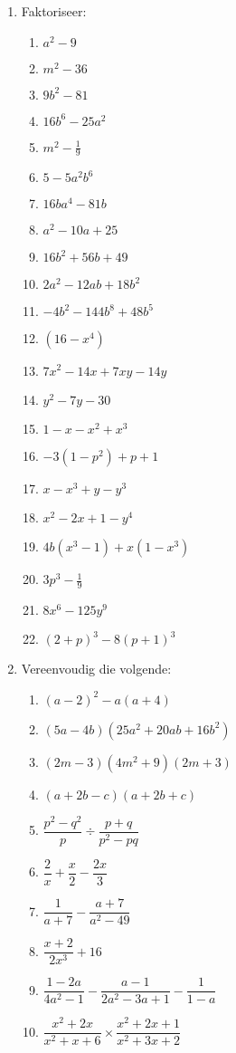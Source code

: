 \begin{eocexercises}{}
\begin{enumerate}[itemsep=5pt, label=\textbf{\arabic*}. ]
\item Faktoriseer:
\begin{multicols}{2}
\begin{enumerate}[itemsep=5pt, label=\textbf{\alph*}. ] 
\item ${a}^{2}-9$
\item ${m}^{2}-36$
\item $9{b}^{2}-81$
\item $16{b}^{6}-25{a}^{2}$
\item ${m}^{2}-\frac{1}{9}$
\item $5-5{a}^{2}{b}^{6}$
\item $16b{a}^{4}-81b$
\item ${a}^{2}-10a+25$
\item $16{b}^{2}+56b+49$
\item $2{a}^{2}-12ab+18{b}^{2}$
\item $-4{b}^{2}-144{b}^{8}+48{b}^{5}$
\item $(16-{x}^{4})$
\item ${7x}^{2}-14x+7xy-14y$
\item ${y}^{2}-7y-30$
\item $1-x-{x}^{2}+{x}^{3}$
\item $-3(1-{p}^{2})+p+1$
\item $x-x^{3} + y - y^{3}$
\item $x^{2} - 2x + 1 - y^{4}$
\item $4b(x^{3} - 1) + x(1-x^{3})$
\item $3p^{3} - \frac{1}{9}$
\item $8x^6-125y^9$
\item $(2+p)^3- 8(p+1)^3$
\end{enumerate}
\end{multicols}


\item Vereenvoudig die volgende:
\begin{multicols}{2}
\begin{enumerate}[itemsep=5pt, label=\textbf{\alph*}. ] 

\item ${(a-2)}^{2}-a(a+4)$
\item $(5a-4b)(25{a}^{2}+20ab+16{b}^{2})$
\item $(2m-3)(4{m}^{2}+9)(2m+3)$
\item $(a+2b-c)(a+2b+c)$
\item $\dfrac{{p}^{2}-{q}^{2}}{p}÷\dfrac{p+q}{{p}^{2}-pq}$
\item $\dfrac{2}{x}+\dfrac{x}{2}-\dfrac{2x}{3}$
\item $\dfrac{1}{a+7}-\dfrac{a+7}{a^{2}-49}$
\item $\dfrac{x+2}{2x^{3}} + 16$
\item $\dfrac{1-2a}{4a^{2} -1} - \dfrac{a-1}{2a^{2}-3a+1} - \dfrac{1}{1-a}$
\item $\dfrac{x^{2} + 2x}{x^{2}+ x + 6} \times \dfrac{x^{2} + 2x + 1}{x^{2} + 3x +2}$
\end{enumerate}
\end{multicols}



\end{enumerate}
\end{eocexercises}
